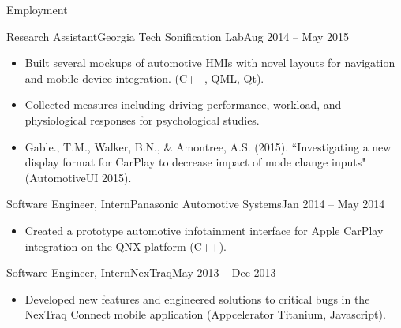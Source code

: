 \documentclass[]{mcdowellcv}
\begin{document}
\begin{cvsection}{Employment}
		\begin{cvsubsection}{Research Assistant}{Georgia Tech Sonification Lab}{Aug 2014 -- May 2015}		
			\begin{itemize}
				\item Built several mockups of automotive HMIs with novel layouts for navigation and mobile device integration. (C++, QML, Qt).
				\item Collected measures including driving performance, workload, and physiological responses for psychological studies.
				\item Gable., T.M., Walker, B.N., \& Amontree, A.S. (2015). ``Investigating a new display format for CarPlay to decrease impact of mode change inputs" (AutomotiveUI 2015).
			\end{itemize}
		\end{cvsubsection}
		
		\begin{cvsubsection}{Software Engineer, Intern}{Panasonic Automotive Systems}{Jan 2014 -- May 2014}
			\begin{itemize}
				\item Created a prototype automotive infotainment interface for Apple CarPlay integration on the QNX platform (C++).
			\end{itemize}
		\end{cvsubsection}

		\begin{cvsubsection}{Software Engineer, Intern}{NexTraq}{May 2013 -- Dec 2013}
			\begin{itemize}
				\item Developed new features and engineered solutions to critical bugs in the NexTraq Connect mobile application (Appcelerator Titanium, Javascript).
			\end{itemize}
		\end{cvsubsection}
	\end{cvsection}
	
	
\end{document}
